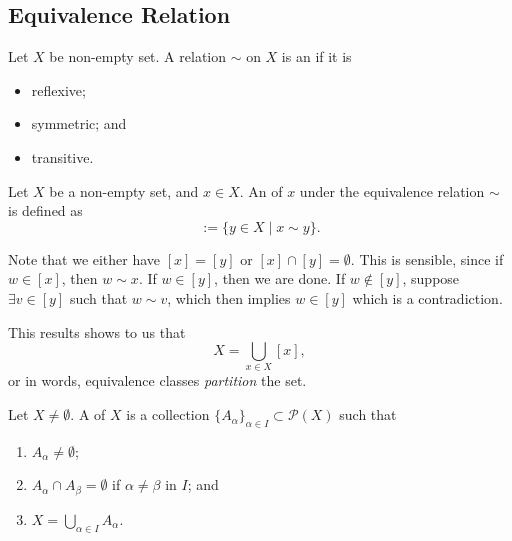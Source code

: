 \documentclass[notoc,notitlepage]{tufte-book}
\begin{document}
\subsection{Equivalence Relation}%
\label{sub:equivalence_relation}

\begin{defn}
\label{defn:equivalence_relation}
  Let $X$ be non-empty set. A relation $\sim$ on $X$ is an  if it is
  \begin{itemize}
    \item reflexive; 
    \item symmetric; and
    \item transitive.
  \end{itemize}
\end{defn}

\begin{defn}
\label{defn:equivalence_class}
  Let $X$ be a non-empty set, and $x \in X$. An  of $x$ under the equivalence relation $\sim$ is defined as
  \begin{equation*}
    [x] := \{ y \in X \mid x \sim y \}.
  \end{equation*}
\end{defn}

\begin{note}
  Note that we either have $[x] = [y]$ or $[x] \cap [y] = \emptyset$. This is sensible, since if $w \in [x]$, then $w \sim x$. If $w \in [y]$, then we are done. If $w \notin [y]$, suppose $\exists v \in [y]$ such that $w \sim v$, which then implies $w \in [y]$ which is a contradiction.

  This results shows to us that
  \begin{equation*}
    X = \bigcup_{x \in X} [x],
  \end{equation*}
  or in words, equivalence classes \textit{partition} the set.
\end{note}

\begin{defn}[Partition]
\label{defn:partition}
  Let $X \neq \emptyset$. A  of $X$ is a collection $\{A_{\alpha} \}_{\alpha \in I} \subset \mathcal{P}(X)$ such that
  \begin{enumerate}
    \item $A_\alpha \neq \emptyset$;
    \item $A_{\alpha} \cap A_{\beta} = \emptyset$ if $\alpha \neq \beta$ in $I$; and
    \item $X = \bigcup_{\alpha \in I} A_\alpha$.
  \end{enumerate}
\end{defn}
\end{document}
